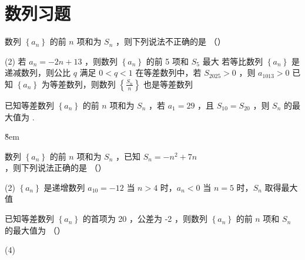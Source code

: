 \section{数列习题}

\begin{example}
    数列 $\left\{a_n\right\}$ 的前 $n$ 项和为 $S_n$ ，则下列说法不正确的是 （\qquad）
    \begin{tasks}(2)
        \task 若 $a_n=-2 n+13$ ，则数列 $\left\{a_n\right\}$ 的前 5 项和 $S_5$ 最大
        \task 若等比数列 $\left\{a_n\right\}$ 是递减数列，则公比 $q$ 满足 $0<q<1$
        \task 在等差数列中，若 $S_{2025}>0$ ，则 $a_{1013}>0$
        \task 已知 $\left\{a_n\right\}$ 为等差数列，则数列 $\left\{\frac{S_n}{n}\right\}$ 也是等差数列
    \end{tasks}
\end{example}

\vspace{10em}

\begin{example}
    已知等差数列 $\left\{a_n\right\}$ 的前 $n$ 项和为 $S_n$ ，若 $a_1=29$ ，且 $S_{10}=S_{20}$ ，则 $S_n$ 的最大值为 \underline{\qquad}.
\end{example}

\v{8em}

\begin{example}
    数列 $\left\{a_n\right\}$ 的前 $n$ 项和为 $S_n$ ，已知 $S_n=-n^2+7 n$ ，则下列说法正确的是 （\qquad）
    \begin{tasks}(2)
        \task $\left\{a_n\right\}$ 是递增数列
        \task $a_{10}=-12$
        \task 当 $n>4$ 时，$a_n<0$
        \task 当 $n=5$ 时，$S_n$ 取得最大值
    \end{tasks}
\end{example}

\vspace{10em}

\begin{example}
    已知等差数列 $\left\{a_n\right\}$ 的首项为 20 ，公差为 -2 ，则数列 $\left\{a_n\right\}$ 的前 $n$ 项和 $S_n$ 的最大值为 （\qquad）
    \begin{tasks}(4)
    \end{tasks}
\end{example}

\vspace{10em}

